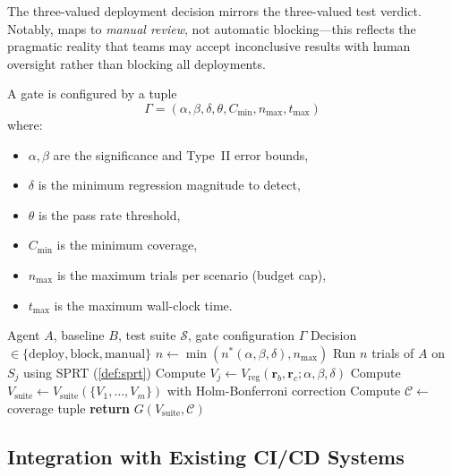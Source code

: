 The three-valued deployment decision mirrors the three-valued test
verdict. Notably, \INCONC{} maps to \emph{manual review}, not automatic
blocking---this reflects the pragmatic reality that teams may accept
inconclusive results with human oversight rather than blocking all
deployments.

\begin{definition}
\label{def:gate-config}
A gate is configured by a tuple
\[
  \Gamma = (\alpha, \beta, \delta, \theta, C_{\min}, n_{\max}, t_{\max})
\]
where:
\begin{itemize}[leftmargin=*]
  \item $\alpha, \beta$ are the significance and Type~II error bounds,
  \item $\delta$ is the minimum regression magnitude to detect,
  \item $\theta$ is the pass rate threshold,
  \item $C_{\min}$ is the minimum coverage,
  \item $n_{\max}$ is the maximum trials per scenario (budget cap),
  \item $t_{\max}$ is the maximum wall-clock time.
\end{itemize}
\end{definition}

\begin{algorithm}[t]
\caption{CI/CD Deployment Gate}
\label{alg:gate}
\begin{algorithmic}[1]
\REQUIRE Agent $A$, baseline $B$, test suite $\mathcal{S}$, gate
  configuration $\Gamma$
\ENSURE Decision $\in \{\text{deploy}, \text{block}, \text{manual}\}$
  \STATE $n \gets \min(n^*(\alpha, \beta, \delta), n_{\max})$
  \STATE Run $n$ trials of $A$ on $S_j$ using SPRT
    (\cref{def:sprt})
  \STATE Compute $V_j \gets V_{\text{reg}}(\mathbf{r}_b, \mathbf{r}_c;
    \alpha, \beta, \delta)$
\ENDFOR
\STATE Compute $V_{\text{suite}} \gets V_{\text{suite}}(\{V_1, \ldots,
  V_m\})$ with Holm-Bonferroni correction
\STATE Compute $\mathcal{C} \gets$ coverage tuple
\STATE \textbf{return} $G(V_{\text{suite}}, \mathcal{C})$
\end{algorithmic}
\end{algorithm}

\subsection{Integration with Existing CI/CD Systems}
\label{sec:cicd:integration}

